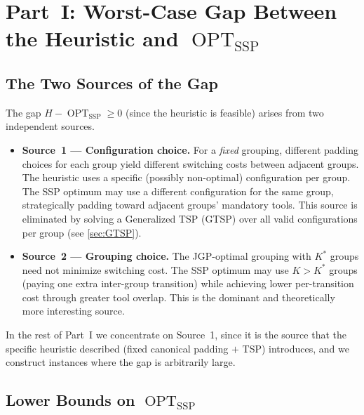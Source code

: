 \documentclass[11pt,a4paper]{article}
\theoremstyle{plain}
\theoremstyle{definition}
\DeclareMathOperator{\OPT}{OPT}
\newcommand{\Heur}{H}               %
\newcommand{\Kstar}{K^{*}}          %
\begin{document}
\section{Part~I: Worst-Case Gap Between the Heuristic and \texorpdfstring{$\OPT_{\text{SSP}}$}{OPT-SSP}}
\label{sec:partI}

\subsection{The Two Sources of the Gap}
\label{sec:sources}

The gap $\Heur - \OPT_{\text{SSP}} \ge 0$ (since the heuristic is feasible) arises from two
independent sources.

\begin{itemize}
  \item \textbf{Source~1 --- Configuration choice.}
        For a \emph{fixed} grouping, different padding choices for each group
        yield different switching costs between adjacent groups.
        The heuristic uses a specific (possibly non-optimal) configuration per group.
        The SSP optimum may use a different configuration for the same group,
        strategically padding toward adjacent groups' mandatory tools.
        This source is eliminated by solving a Generalized TSP (GTSP) over all valid
        configurations per group (see \cref{sec:GTSP}).

  \item \textbf{Source~2 --- Grouping choice.}
        The JGP-optimal grouping with $\Kstar$ groups need not minimize switching cost.
        The SSP optimum may use $K > \Kstar$ groups (paying one extra inter-group
        transition) while achieving lower per-transition cost through greater tool overlap.
        This is the dominant and theoretically more interesting source.
\end{itemize}

In the rest of Part~I we concentrate on Source~1, since it is the source that the
specific heuristic described (fixed canonical padding $+$ TSP) introduces, and we
construct instances where the gap is arbitrarily large.

\subsection{Lower Bounds on \texorpdfstring{$\OPT_{\text{SSP}}$}{OPT-SSP}}
\label{sec:LB}
\end{document}
